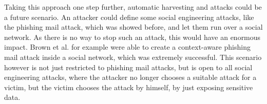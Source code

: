 Taking this approach one step further, automatic harvesting and attacks could
be a future scenario. An attacker could define some social engineering attacks,
like the phishing mail attack, which was showed before, and let them run over a
social network. As there is no way to stop such an attack, this would have an
enormous impact. Brown et al. \cite{brown2008} for example were able to create
a context-aware phishing mail attack inside a social network, which was
extremely successful. This scenario however is not just restricted to phishing
mail attacks, but is open to all social engineering attacks, where the attacker
no longer chooses a suitable attack for a victim, but the victim chooses the
attack by himself, by just exposing sensitive data.
